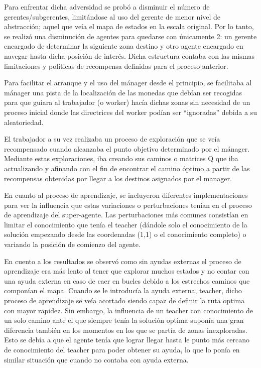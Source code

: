 \documentclass[letterpaper]{article} %
\begin{document}
Para enfrentar dicha adversidad se probó a disminuir el número de gerentes/subgerentes, limitándose al uso del gerente de menor nivel de abstracción; aquel que veía el mapa de estados en la escala original. Por lo tanto, se realizó una disminución de agentes para quedarse con únicamente 2: un gerente encargado de determinar la siguiente zona destino y otro agente encargado en navegar hasta dicha posición de interés. Dicha estructura contaba con las mismas limitaciones y políticas de recompensa definidas para el proceso anterior.


Para facilitar el arranque y el uso del mánager desde el principio, se facilitaba al mánager una pista de la localización de las monedas que debían ser recogidas para que guiara al trabajador (o worker) hacía dichas zonas sin necesidad de un proceso inicial donde las directrices del worker podían ser “ignoradas” debida a su aleatoriedad. 

El trabajador a su vez realizaba un proceso de exploración que se veía recompensado cuando alcanzaba el punto objetivo determinado por el mánager. Mediante estas exploraciones, iba creando sus caminos o matrices Q que iba actualizando y afinando con el fin de encontrar el camino óptimo a partir de las recompensas obtenidas por llegar a los destinos asignados por el manager.

En cuanto al proceso de aprendizaje, se incluyeron diferentes implementaciones para ver la influencia que estas variaciones o perturbaciones tenían en el proceso de aprendizaje del super-agente. Las perturbaciones más comunes consistían en limitar el conocimiento que tenía el teacher (dándole solo el conocimiento de la solución empezando desde las coordenadas (1,1) o el conocimiento completo) o variando la posición de comienzo del agente.

En cuento a los resultados se observó como sin ayudas externas el proceso de aprendizaje era más lento al tener que explorar muchos estados y no contar con una ayuda externa en caso de caer en bucles debido a los estrechos caminos que componían el mapa. Cuando se le introducía la ayuda externa, teacher, dicho proceso de aprendizaje se veía acortado siendo capaz de definir la ruta optima con mayor rapidez. Sin embargo, la influencia de un teacher con conocimiento de un solo camino ante el que siempre tenía la solución optima suponía una gran diferencia también en los momentos en los que se partía de zonas inexploradas. Esto se debía a que el agente tenía que lograr llegar hasta le punto más cercano de conocimiento del teacher para poder obtener su ayuda, lo que lo ponía en similar situación que cuando no contaba con ayuda externa.
\end{document}
